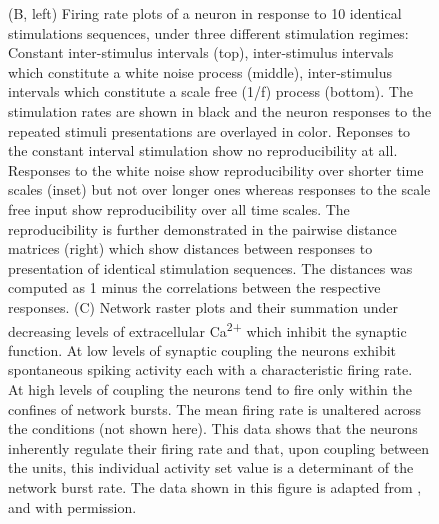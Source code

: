     \begin{figure}
        \captionsetup{labelformat=adja-page}
        \ContinuedFloat
        \caption{(B, left) Firing rate plots of a neuron in response to 10 identical stimulations sequences, under three different stimulation regimes: Constant inter-stimulus intervals (top), inter-stimulus intervals which constitute a white noise process (middle), inter-stimulus intervals which constitute a scale free (1/f) process (bottom). The stimulation rates are shown in black and the neuron responses to the repeated stimuli presentations are overlayed in color. Reponses to the constant interval stimulation show no reproducibility at all. Responses to the white noise show reproducibility over shorter time scales (inset) but not over longer ones whereas responses to the scale free input show reproducibility over all time scales. The reproducibility is further demonstrated in the pairwise distance matrices (right) which show distances between responses to presentation of identical stimulation sequences. The distances was computed as 1 minus the correlations between the respective responses. (C) Network raster plots and their summation under decreasing levels of extracellular Ca\textsuperscript{2+} which inhibit the synaptic function. At low levels of synaptic coupling the neurons exhibit spontaneous spiking activity each with a characteristic firing rate. At high levels of coupling the neurons tend to fire only within the confines of network bursts. The mean firing rate is unaltered across the conditions (not shown here). This data shows that the neurons inherently regulate their firing rate and that, upon coupling between the units, this individual activity set value is a determinant of the network burst rate. The data shown in this figure is adapted from \cite{fong2015upward}, \cite{gal2013entrainment} and \cite{penn2016network} with permission.}

        \label{fig:introduction:MEAAch}
    \end{figure}



